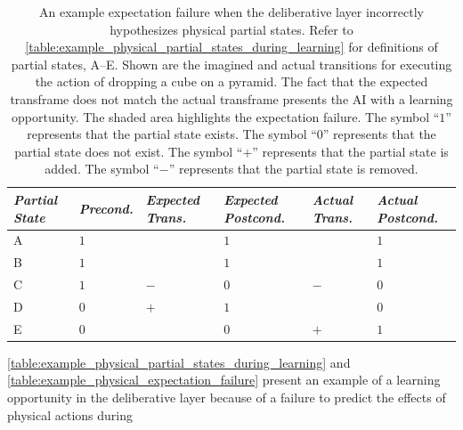 \begin{table}
\centering
\begin{tabular}{p{1cm}|p{1.5cm}|p{1.5cm}p{1.5cm}|p{1.5cm}p{1.5cm}|}
{\emph{Partial State}} &{\emph{Precond.}} &{\emph{Expected Trans.}}  &{\emph{Expected Postcond.}}  &{\emph{Actual Trans.}}  &{\emph{Actual Postcond.}}  \\
\hline
A                      & $1$            &                       & $1$                   &                       & $1$                   \\
B                      & $1$            &                       & $1$                   &                       & $1$                   \\
C                      & $1$            & $-$                   & $0$                   & $-$                   & $0$                   \\
D                      & $0$            & \cellcolor{red!10}$+$ & \cellcolor{red!10}$1$ & \cellcolor{red!10}    & \cellcolor{red!10}$0$ \\
E                      & $0$            & \cellcolor{red!10}    & \cellcolor{red!10}$0$ & \cellcolor{red!10}$+$ & \cellcolor{red!10}$1$ \\
\hline
\end{tabular}
\caption[An example expectation failure when the deliberative layer
  incorrectly hypothesizes physical partial states.]{An example
  expectation failure when the deliberative layer incorrectly
  hypothesizes physical partial states.  Refer to
  {\mbox{\autoref{table:example_physical_partial_states_during_learning}}}
  for definitions of partial states, A--E.  Shown are the imagined and
  actual transitions for executing the action of dropping a cube on a
  pyramid.  The fact that the expected transframe does not match the
  actual transframe presents the AI with a learning opportunity.  The
  shaded area highlights the expectation failure.  The symbol ``$1$''
  represents that the partial state exists.  The symbol ``$0$''
  represents that the partial state does not exist.  The symbol
  ``$+$'' represents that the partial state is added.  The symbol
  ``$-$'' represents that the partial state is removed.}
\label{table:example_physical_expectation_failure}
\end{table}
{\mbox{\autoref{table:example_physical_partial_states_during_learning}}}
and {\mbox{\autoref{table:example_physical_expectation_failure}}}
present an example of a learning opportunity in the deliberative layer
because of a failure to predict the effects of physical actions during
